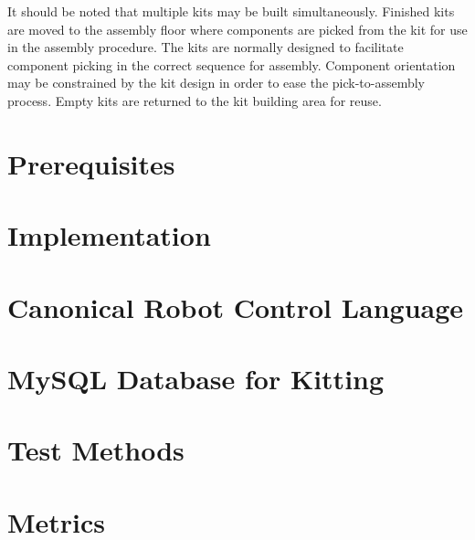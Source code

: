 It should be noted that multiple kits may be built simultaneously.
Finished kits are moved to the assembly floor where components
are picked from the kit for use in the assembly procedure.
The kits are normally designed to facilitate component picking in the correct
sequence for assembly. Component orientation may be constrained
by the kit design in order to ease the pick-to-assembly process.
Empty kits are returned to the kit building area for reuse.

\renewcommand{\topfraction}{1.0}
\setcounter{topnumber}{100}

\section{Prerequisites}
\label{sect:Prerequisites}


\section{Implementation}
\label{sect:Implementation}


\section{Canonical Robot Control Language}
\label{sect:CRCL}


\section{MySQL Database for Kitting}
\label{sect:MySQL}


\section{Test Methods}
\label{sect:TestMethods}


\section{Metrics}
\label{sect:Metrics}


